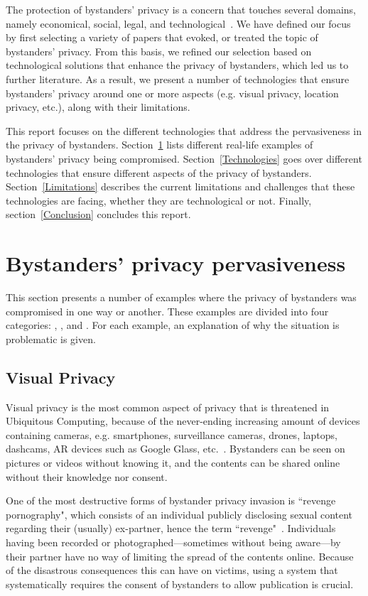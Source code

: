 \documentclass[conference]{IEEEtran}
\begin{document}
The protection of bystanders' privacy is a concern that touches several domains, namely economical, social, legal, and technological~\cite{lu2017privacy}. We have defined our focus by first selecting a variety of papers that evoked, or treated the topic of bystanders' privacy. From this basis, we refined our selection based on technological solutions that enhance the privacy of bystanders, which led us to further literature. As a result, we present a number of technologies that ensure bystanders' privacy around one or more aspects (e.g. visual privacy, location privacy, etc.), along with their limitations.

This report focuses on the different technologies that address the pervasiveness in the privacy of bystanders. Section~\ref{BystandersPrivacy} lists different real-life examples of bystanders' privacy being compromised. Section~\ref{Technologies} goes over different technologies that ensure different aspects of the privacy of bystanders. Section~\ref{Limitations} describes the current limitations and challenges that these technologies are facing, whether they are technological or not. Finally, section~\ref{Conclusion} concludes this report.

\section{Bystanders’ privacy pervasiveness}\label{BystandersPrivacy}
This section presents a number of examples where the privacy of bystanders was compromised in one way or another. These examples are divided into four categories: , , and . For each example, an explanation of why the situation is problematic is given.

\subsection{Visual Privacy}\label{Videos}
Visual privacy is the most common aspect of privacy that is threatened in Ubiquitous Computing, because of the never-ending increasing amount of devices containing cameras, e.g. smartphones, surveillance cameras, drones, laptops, dashcams, \ac{AR} devices such as Google Glass, etc.~\cite{lu2017privacy, yao2017privacy, chinomi2008PriSurv}. Bystanders can be seen on pictures or videos without knowing it, and the contents can be shared online without their knowledge nor consent. 

One of the most destructive forms of bystander privacy invasion is ``revenge pornography", which consists of an individual publicly disclosing sexual content regarding their (usually) ex-partner, hence the term ``revenge"~\cite{olteanu2018consensual}. Individuals having been recorded or photographed---sometimes without being aware---by their partner have no way of limiting the spread of the contents online. Because of the disastrous consequences this can have on victims, using a system that systematically requires the consent of bystanders to allow publication is crucial.
\end{document}
